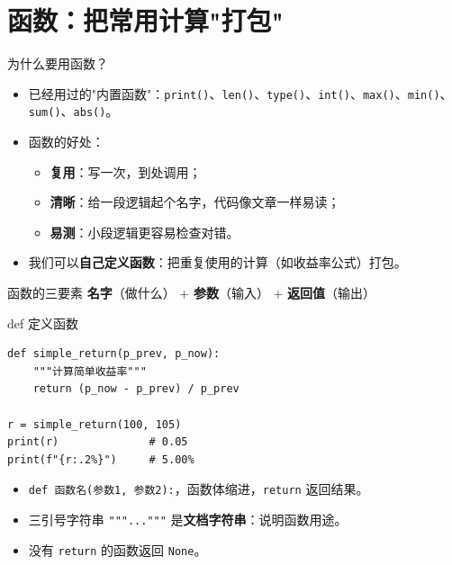 \documentclass[9pt]{ctexbeamer}
\begin{document}
\section{函数：把常用计算"打包"}

\begin{frame}{为什么要用函数？}
	\begin{itemize}
		\item 已经用过的"内置函数"：\texttt{print()}、\texttt{len()}、\texttt{type()}、\texttt{int()}、\texttt{max()}、\texttt{min()}、\texttt{sum()}、\texttt{abs()}。
		\item 函数的好处：
		\begin{itemize}
			\item \textbf{复用}：写一次，到处调用；
			\item \textbf{清晰}：给一段逻辑起个名字，代码像文章一样易读；
			\item \textbf{易测}：小段逻辑更容易检查对错。
		\end{itemize}
		\item 我们可以\textbf{自己定义函数}：把重复使用的计算（如收益率公式）打包。
	\end{itemize}
	\begin{block}{函数的三要素}
		\centering
		\textbf{名字}（做什么） + \textbf{参数}（输入） + \textbf{返回值}（输出）
	\end{block}
\end{frame}

\begin{frame}[fragile]{def 定义函数}
	\begin{lstlisting}
def simple_return(p_prev, p_now):
    """计算简单收益率"""
    return (p_now - p_prev) / p_prev

r = simple_return(100, 105)
print(r)              # 0.05
print(f"{r:.2%}")     # 5.00%
\end{lstlisting}
	\begin{itemize}
		\item \texttt{def 函数名(参数1, 参数2):}，函数体缩进，\texttt{return} 返回结果。
		\item 三引号字符串 \texttt{"""..."""} 是\textbf{文档字符串}：说明函数用途。
		\item 没有 \texttt{return} 的函数返回 \texttt{None}。
	\end{itemize}
\end{frame}
\end{document}
